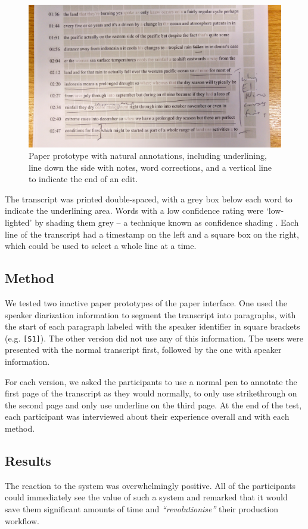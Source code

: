 \begin{figure}[h]
  \centering
  \includegraphics[width=\columnwidth]{figs/mockup}
  \caption{Paper prototype with natural annotations, including
    underlining, line down the side with notes, word corrections, and a
    vertical line to indicate the end of an edit.}
  \label{fig:natural}
\end{figure}

The transcript was printed double-spaced, with a grey box below each word to indicate the underlining area.  Words with
a low confidence rating were `low-lighted' by shading them grey -- a technique known as confidence
shading \citep{Vemuri2004}.  Each line of the transcript had a timestamp on the left and a square box on the right, which
could be used to select a whole line at a time.

\subsection{Method}
We tested two inactive paper prototypes of the paper interface.  One used the speaker diarization information to
segment the transcript into paragraphs, with the start of each paragraph labeled with the speaker identifier in square
brackets (e.g.  \texttt{{[}S1{]}}). The other version did not use any of this information. The users were presented
with the normal transcript first, followed by the one with speaker information.

For each version, we asked the participants to use a normal pen to annotate the first page of the transcript as they
would normally, to only use strikethrough on the second page and only use underline on the third page. At the end of
the test, each participant was interviewed about their experience overall and with each method.

\subsection{Results}
The reaction to the system was overwhelmingly positive. All of the participants could immediately see the value of such
a system and remarked that it would save them significant amounts of time and \textit{``revolutionise''} their
production workflow.

